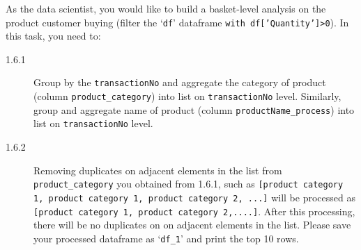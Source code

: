 \documentclass[a4paper]{article}
\begin{document}
    
    \begin{answer}[Question 1.6]
    As the data scientist, you would like to build a basket-level analysis on the product customer buying (filter the `\texttt{df}' dataframe \texttt{with df['Quantity']>0}).
    In this task, you need to:
    \begin{description}
        \item[1.6.1] Group by the \texttt{transactionNo} and aggregate the category of product (column \texttt{product_category}) into list on \texttt{transactionNo} level.
        Similarly, group and aggregate name of product (column \texttt{productName_process}) into list on \texttt{transactionNo} level.
        \item[1.6.2] Removing duplicates on adjacent elements in the list from \texttt{product_category} you obtained from 1.6.1, such as \texttt{[product category 1, product category 1, product category 2, ...]} will be processed as \texttt{[product category 1, product category 2,....]}. After this processing, there will be no duplicates on on adjacent elements in the list. Please save your processed dataframe as `\texttt{df_1}' and print the top 10 rows.
    \end{description}
    \end{answer}
    
\end{document}
